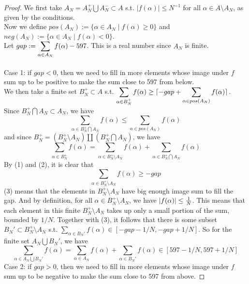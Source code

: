 \documentclass[lang=cn,11pt]{elegantbook}
\begin{document}
\begin{proof}
We first take $A_N = A_N^+ \bigcup A_N^- \subset A$  s.t.   $\lvert f(\alpha) \rvert \leq N^{-1}$ for all $\alpha \in A \setminus A_N$, as given by the conditions.\\
Now we define $pos(A_N) := \{ \alpha \in A_N \mid f(\alpha) \geq 0 \}$ and $neg(A_N) := \{ \alpha \in A_N \mid f(\alpha) < 0 \}$.\\
Let $gap := \displaystyle \sum_{\alpha \in A_N} f(\alpha) - 597$. This is a real number since $A_N$ is finite.\\\\
Case 1: if $gap<0$, then we need to fill in more elements whose image under $f$ sum up to be positive to make the sum close to 597 from below. \\ 
We then take a finite set $B_N^+ \subset A$ s.t. $\displaystyle \sum_{\alpha \in B_N^+} f(\alpha) \geq \lceil -gap + \sum_{\alpha \in pos(A_N)} f(\alpha) \rceil$.\\
Since $B_N^+ \bigcap A_N \subset A_N$, we have 
\begin{equation}
  \sum_{\alpha \in B_N^+ \bigcap A_N} f(\alpha) \leq \sum_{\alpha \in pos(A_N)} f(\alpha)  
\end{equation}
and since $B_N^+ = (B_N^+ \setminus A_N) \coprod (B_N^+ \bigcap A_N)$, we have
\begin{equation}
    \sum_{\alpha \in B_N^+} f(\alpha)= \sum_{\alpha \in B_N^+ \setminus A_N} f(\alpha) + \sum_{\alpha \in B_N^+ \bigcap A_N} f(\alpha)
\end{equation}
By (1) and (2), it is clear that 
\begin{equation}
 \sum_{\alpha \in B_N^+ \setminus A_N} f(\alpha) \geq -gap 
\end{equation}
(3) means that the elements in $B_N^+ \setminus A_N$ have big enough image sum to fill the gap.
And by definition, for all $\alpha \in B_N^+ \setminus A_N$, we have $|f(\alpha)|\leq {1\over N}$. This means that each element in this finite $B_N^+ \setminus A_N$ takes up only a small portion of the sum, bounded by $1/N$.
Together with (3), it follows that there is some subset $B_N' \subset B_N^+ \setminus A_N$ s.t. $\sum_{\alpha \in B_N'} f(\alpha) \in [-gap-1/N, -gap+1/N]$. So for the finite set $A_N \bigcup B_N'$, we have 
\begin{equation}
    \sum_{\alpha \in A_N \bigcup B_N'}f(\alpha) = \sum_{\alpha \in A_N}f(\alpha) + \sum_{\alpha \in  B_N'}f(\alpha) \in [597-1/N, 597+1/N]
\end{equation}
Case 2: if $gap>0$, then we need to fill in more elements whose image under $f$ sum up to be negative to make the sum close to 597 from above.

\end{proof}
\end{document}
